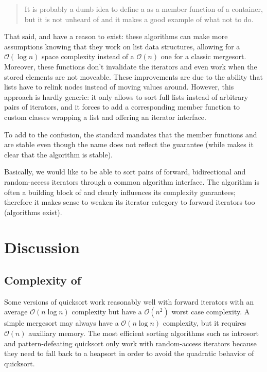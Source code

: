 \documentclass{isocpp_proposal}
\begin{document}
\begin{quotation}
It is probably a dumb idea to define a  as a member function of a container, but it is not unheard of and it makes a good example of what not to do.
\end{quotation}

That said,  and  have a reason to exist: these algorithms can make more assumptions knowing that they work on list data structures, allowing for a  $\mathcal{O}(\log{} n)$ space complexity instead of a  $\mathcal{O}(n)$ one for a classic mergesort. Moreover, these functions don't invalidate the iterators and even work when the stored elements are not moveable. These improvements are due to the ability that lists have to relink nodes instead of moving values around. However, this approach is hardly generic: it only allows to sort full lists instead of arbitrary pairs of iterators, and it forces to add a corresponding member function  to custom classes wrapping a list and offering an iterator interface.

\vspace{0.3cm}

To add to the confusion, the standard mandates that the member functions  and  are stable even though the name does not reflect the guarantee (while  makes it clear that the algorithm is stable).

\vspace{0.3cm}

Basically, we would like to be able to sort pairs of forward, bidirectional and random-access iterators through a common algorithm interface. The algorithm  is often a building block of  and clearly influences its complexity guarantees; therefore it makes sense to weaken its iterator category to forward iterators too (algorithms exist).

\section{Discussion}

\subsection{Complexity of }

Some versions of quicksort work reasonably well with forward iterators with an average $\mathcal{O}(n \log{} n)$ complexity but have a $\mathcal{O}(n^2)$ worst case complexity. A simple mergesort may always have a $\mathcal{O}(n \log{} n)$ complexity, but it requires $\mathcal{O}(n)$ auxiliary memory. The most efficient sorting algorithms such as introsort \cite{introsort} and pattern-defeating quicksort \cite{pdqsort} only work with random-access iterators because they need to fall back to a heapsort in order to avoid the quadratic behavior of quicksort.
\end{document}

